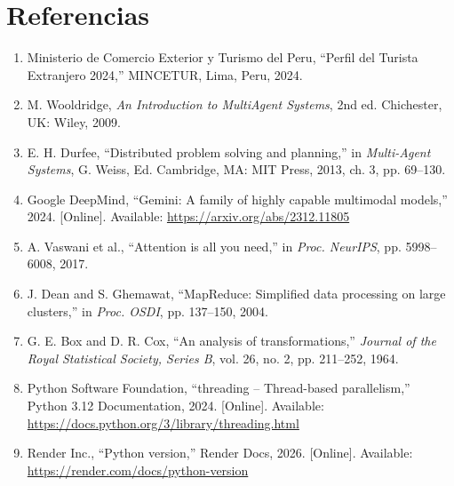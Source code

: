 \documentclass[10pt,twocolumn,a4paper]{article}
\begin{document}
\section*{Referencias}
\begingroup
\small
\begin{enumerate}
\setlength{\itemsep}{0pt}
\setlength{\parsep}{0pt}

\item Ministerio de Comercio Exterior y Turismo del Peru,
  ``Perfil del Turista Extranjero 2024,'' MINCETUR, Lima, Peru,
  2024.

\item M. Wooldridge, \textit{An Introduction to MultiAgent
  Systems}, 2nd ed. Chichester, UK: Wiley, 2009.

\item E. H. Durfee, ``Distributed problem solving and planning,''
  in \textit{Multi-Agent Systems}, G. Weiss, Ed. Cambridge, MA:
  MIT Press, 2013, ch. 3, pp. 69--130.

\item Google DeepMind, ``Gemini: A family of highly capable
  multimodal models,'' 2024. [Online]. Available:
  \url{https://arxiv.org/abs/2312.11805}

\item A. Vaswani et al., ``Attention is all you need,''
  in \textit{Proc. NeurIPS}, pp. 5998--6008, 2017.

\item J. Dean and S. Ghemawat, ``MapReduce: Simplified data
  processing on large clusters,'' in \textit{Proc. OSDI},
  pp. 137--150, 2004.

\item G. E. Box and D. R. Cox, ``An analysis of transformations,''
  \textit{Journal of the Royal Statistical Society, Series B},
  vol. 26, no. 2, pp. 211--252, 1964.

\item Python Software Foundation, ``threading -- Thread-based
  parallelism,'' Python 3.12 Documentation, 2024. [Online].
  Available: \url{https://docs.python.org/3/library/threading.html}

\item Render Inc., ``Python version,'' Render Docs, 2026.
  [Online]. Available: \url{https://render.com/docs/python-version}

\end{enumerate}
\endgroup
\end{document}
